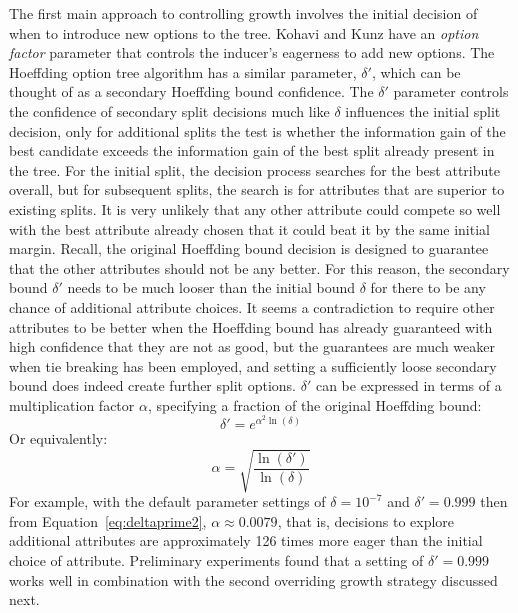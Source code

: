 The first main approach to controlling growth involves the initial decision of when to introduce new options to the tree. Kohavi and Kunz have an {\em option factor} parameter that controls the inducer's eagerness to add new options. The Hoeffding option tree algorithm has a similar parameter, $\delta'$, which can be thought of as a secondary Hoeffding bound confidence. The $\delta'$ parameter controls the confidence of secondary split decisions much like $\delta$ influences the initial split decision, only for additional splits 
the test is whether the information gain of the best candidate exceeds the information gain of the best split already present in the tree.
For the initial split, the decision process searches for the best attribute overall, but for subsequent splits, the search is for attributes that are superior to existing splits. It is very unlikely that any other attribute could compete so well with the best attribute already chosen that it could beat it by the same initial margin. Recall, the original Hoeffding bound decision is designed to guarantee that the other attributes should not be any better. For this reason, the secondary bound $\delta'$ needs to be much looser than the initial bound $\delta$ for there to be any chance of additional attribute choices.
It seems a contradiction to require other attributes to be better when the Hoeffding bound has already guaranteed with high confidence that they are not as good, but the guarantees are much weaker when tie breaking has been employed, and setting a sufficiently loose secondary bound does indeed create further split options.
$\delta'$ can be expressed in terms of a multiplication factor $\alpha$, specifying a fraction of the original Hoeffding bound:
\begin{equation}
\delta' = e^{\alpha ^ 2 \ln(\delta)}
\label{eq:deltaprime1}
\end{equation}
Or equivalently:
\begin{equation}
\alpha = \sqrt{\frac{\ln(\delta')}{\ln(\delta)}}
\label{eq:deltaprime2}
\end{equation}
For example, with the default parameter settings of $\delta=10^{-7}$ and $\delta'=0.999$ then from Equation~\ref{eq:deltaprime2}, $\alpha \approx 0.0079$, that is, decisions to explore additional attributes are approximately 126 times more eager than the initial choice of attribute. Preliminary experiments found that a setting of $\delta'=0.999$ works well in combination with the second overriding growth strategy discussed next.

